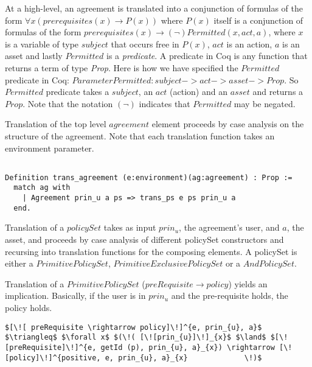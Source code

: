 At a high-level, an agreement is translated into a conjunction of formulas of the form $\forall x ( prerequisites(x) \rightarrow P(x))$ where $P(x)$ itself is a conjunction of formulas of the form $ prerequisites(x) \rightarrow (\lnot) Permitted (x, act, a)$, where $x$ is a variable of type $subject$ that occurs free in $P(x)$, $act$ is an action, $a$ is an asset and lastly $Permitted$ is a \emph{predicate}. A predicate in Coq is any function that returns a term of type \emph{Prop}. Here is how we have specified the $Permitted$ predicate in Coq: $Parameter Permitted : subject -> act -> asset -> Prop.$ So $Permitted$ predicate takes a $subject$, an $act$ (action) and an $asset$ and returns a $Prop$. Note that the notation $(\lnot)$ indicates that $Permitted$ may be negated.

Translation of the top level $agreement$ element proceeds by case analysis on the structure of the agreement. Note that each translation function takes an environment parameter.


\begin{lstlisting}

Definition trans_agreement (e:environment)(ag:agreement) : Prop :=
  match ag with 
    | Agreement prin_u a ps => trans_ps e ps prin_u a
  end.

\end{lstlisting}

Translation of a $policySet$ takes as input $prin_{u}$, the agreement's user, and $a$, the asset, and proceeds by case analysis of different policySet constructors and recursing into translation functions for the composing elements. A policySet is either a $PrimitivePolicySet$, $PrimitiveExclusivePolicySet$ or a $AndPolicySet$. 

Translation of a $PrimitivePolicySet$ ($preRequisite \rightarrow policy$) yields an implication. Basically, if the user is in $prin_{u}$ and the pre-requisite holds, the policy holds.

\lstset{mathescape, language=AST}  
\begin{lstlisting}[frame=single, caption={Policy Set Translation {$\colon$} PrimitivePolicySet},label={lst:transpolicyformulaPrimitivePolicySet}]
$[\![ preRequisite \rightarrow policy]\!]^{e, prin_{u}, a}$ $\triangleq$ $\forall x$ $(\!( [\![prin_{u}]\!]_{x}$ $\land$ $[\![preRequisite]\!]^{e, getId (p), prin_{u}, a}_{x}) \rightarrow [\![policy]\!]^{positive, e, prin_{u}, a}_{x}             \!)$
\end{lstlisting}

